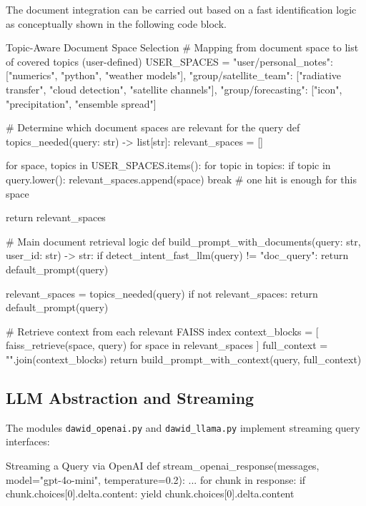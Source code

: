 The document integration can be carried out based on a fast identification logic
as conceptually shown in the following code block. 

\begin{codeonly}{Topic-Aware Document Space Selection}
# Mapping from document space to list of covered topics (user-defined)
USER_SPACES = {
    "user/personal_notes": ["numerics", "python", "weather models"],
    "group/satellite_team": ["radiative transfer", "cloud detection", "satellite channels"],
    "group/forecasting": ["icon", "precipitation", "ensemble spread"]
}

# Determine which document spaces are relevant for the query
def topics_needed(query: str) -> list[str]:
    relevant_spaces = []

    for space, topics in USER_SPACES.items():
        for topic in topics:
            if topic in query.lower():
                relevant_spaces.append(space)
                break  # one hit is enough for this space

    return relevant_spaces

# Main document retrieval logic
def build_prompt_with_documents(query: str, user_id: str) -> str:
    if detect_intent_fast_llm(query) != "doc_query":
        return default_prompt(query)

    relevant_spaces = topics_needed(query)
    if not relevant_spaces:
        return default_prompt(query)

    # Retrieve context from each relevant FAISS index
    context_blocks = [
        faiss_retrieve(space, query) for space in relevant_spaces
    ]
    full_context = "\n\n".join(context_blocks)
    return build_prompt_with_context(query, full_context)
\end{codeonly}




%
\subsection*{LLM Abstraction and Streaming}

The modules \texttt{dawid\_openai.py} and \texttt{dawid\_llama.py} implement streaming query interfaces:

\begin{codeonly}{Streaming a Query via OpenAI}
def stream_openai_response(messages, model="gpt-4o-mini", temperature=0.2):
    ...
    for chunk in response:
        if chunk.choices[0].delta.content:
            yield chunk.choices[0].delta.content
\end{codeonly}

